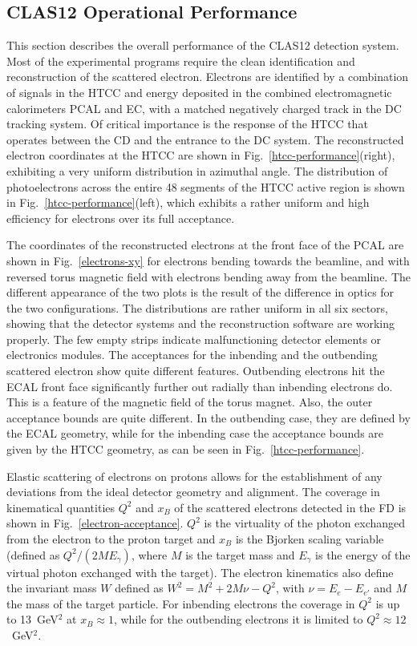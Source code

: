 \documentclass[final,3p]{elsarticle}
\begin{document}
\begin{twocolumn}
\section{CLAS12 Operational Performance}

This section describes the overall performance of the CLAS12 detection system. Most of the experimental programs
require the clean identification and reconstruction of the scattered electron. Electrons are identified by a combination
of signals in the HTCC and energy deposited in the combined electromagnetic calorimeters PCAL and EC, with a matched
negatively charged track in the DC tracking system. Of critical importance is the response of the HTCC that operates
between the CD and the entrance to the DC system. The reconstructed electron coordinates at the HTCC are shown in
Fig.~\ref{htcc-performance}(right), exhibiting a very uniform distribution in azimuthal angle. The distribution of
photoelectrons across the entire 48 segments of the HTCC active region is shown in Fig.~\ref{htcc-performance}(left),
which exhibits a rather uniform and high efficiency for electrons over its full acceptance.

The coordinates of the reconstructed electrons at the front face of the PCAL are shown in Fig.~\ref{electrons-xy} for
electrons bending towards the beamline, and with reversed torus magnetic field with electrons bending away from the
beamline. The different appearance of the two plots is the result of the difference in optics for the two configurations.
The distributions are rather uniform in all six sectors, showing that the detector systems and the reconstruction
software are working properly. The few empty strips indicate malfunctioning detector elements or electronics modules.
The acceptances for the inbending and the outbending scattered electron show quite different features. Outbending
electrons hit the ECAL front face significantly further out radially than inbending electrons do. This is a feature of the
magnetic field of the torus magnet.  Also, the outer acceptance bounds are quite different. In the outbending case, they
are defined by the ECAL geometry, while for the inbending case the acceptance bounds are given by the HTCC geometry,
as can be seen in Fig.~\ref{htcc-performance}.      

Elastic scattering  of electrons on protons allows for the establishment of any deviations from the ideal detector
geometry and alignment. The coverage in kinematical quantities $Q^2$ and $x_B$ of the scattered electrons detected
in the FD is shown in Fig.~\ref{electron-acceptance}. $Q^2$ is the virtuality of the photon exchanged from the
electron to the proton target and $x_B$ is the Bjorken scaling variable (defined as $Q^2/(2 M E_\gamma)$, where $M$
is the target mass and $E_\gamma$ is the energy of the virtual photon exchanged with the target). The electron
kinematics also define the invariant mass $W$ defined as $W^2 = M^2 + 2M\nu - Q^2$, with $\nu = E_e - E_{e'}$ and
$M$ the mass of the target particle. For inbending electrons the coverage in $Q^2$ is up to 13~GeV$^2$ at
$x_B \approx 1$, while for the outbending electrons it is limited to  $Q^2 \approx 12$~GeV$^2$. 


\end{twocolumn}
\end{document}
